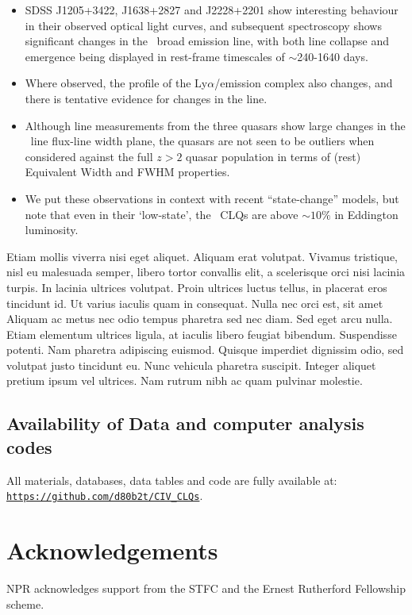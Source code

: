 \documentclass[a4paper,fleqn,usenatbib]{mnras}
\begin{document}
\begin{itemize}
  \item SDSS J1205+3422, J1638+2827 and J2228+2201 show interesting behaviour
in their observed optical light curves, and subsequent spectroscopy
shows significant changes in the \civ\ broad emission line, with both
line collapse and emergence being displayed in rest-frame timescales
of $\sim$240-1640 days.
\item Where observed, the profile of the Ly$\alpha$/\nv emission complex
also changes, and there is tentative evidence for changes in the \mgii
line.
\item Although line measurements from the three quasars show large changes
in the \civ\ line flux-line width plane, the quasars are not seen to
be outliers when considered against the full $z>2$ quasar population
in terms of (rest) Equivalent Width and FWHM properties.
\item 
We put these observations in context with recent ``state-change''
models, but note that even in their `low-state', the \civ\ CLQs are
above $\sim10\%$ in Eddington luminosity.
\end{itemize}

Etiam mollis viverra nisi eget aliquet. Aliquam erat volutpat. Vivamus
tristique, nisl eu malesuada semper, libero tortor convallis elit, a
scelerisque orci nisi lacinia turpis. In lacinia ultrices
volutpat. Proin ultrices luctus tellus, in placerat eros tincidunt
id. Ut varius iaculis quam in consequat. Nulla nec orci est, sit amet
Aliquam ac metus nec odio tempus pharetra sed nec diam. Sed eget arcu
nulla. Etiam elementum ultrices ligula, at iaculis libero feugiat
bibendum. Suspendisse potenti. Nam pharetra adipiscing
euismod. Quisque imperdiet dignissim odio, sed volutpat justo
tincidunt eu. Nunc vehicula pharetra suscipit. Integer aliquet pretium
ipsum vel ultrices. Nam rutrum nibh ac quam pulvinar molestie.



\subsection*{Availability of Data and computer analysis codes} 
All materials, databases, data tables and code are fully available at: 
\href{https://github.com/d80b2t/CIV_CLQs}{\tt https://github.com/d80b2t/CIV\_CLQs}.


\section*{Acknowledgements}
NPR acknowledges support from the STFC and the Ernest Rutherford Fellowship scheme. 
\\
\end{document}
